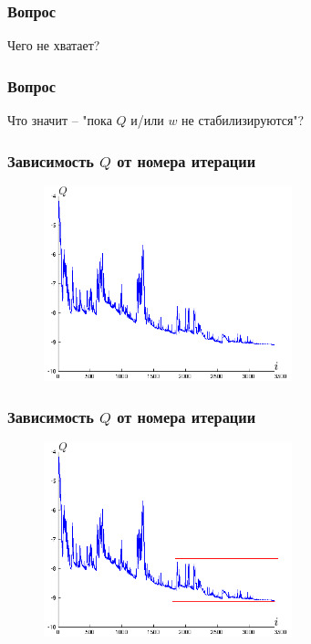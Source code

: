 \documentclass[12pt]{beamer}
\begin{document}
\begin{frame}\frametitle{Вопрос}
Чего не хватает?
\end{frame}



\begin{frame}\frametitle{Вопрос}
Что значит -- "пока $Q$ и/или $w$ не стабилизируются"?
\end{frame}

\begin{frame}\frametitle{Зависимость $Q$ от номера итерации}
\begin{figure}[htbp]
  \includegraphics[height=160pt, keepaspectratio = true]{images/stochastic_gradient}
\end{figure}
\end{frame}

\begin{frame}\frametitle{Зависимость $Q$ от номера итерации}
\begin{figure}[htbp]
  \includegraphics[height=160pt, keepaspectratio = true]{images/stochastic_gradient1}
\end{figure}
\end{frame}
\end{document}
